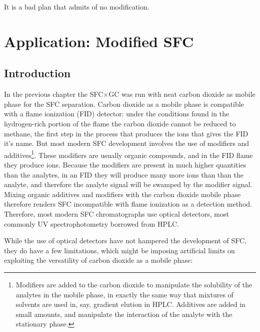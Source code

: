 
\begin{savequote}[\quotewidth]
It is a bad plan that admits of no modification.
\end{savequote}

\chapter{Application: Modified SFC} %

\label{Chapter7} %

\section{Introduction}

In the previous chapter the SFC×GC was run with neat carbon dioxide as mobile
phase for the SFC separation. Carbon dioxide as a mobile phase is compatible with
a flame ionization (FID) detector: under the conditions found in the
hydrogen-rich portion of the flame the carbon dioxide cannot be reduced to
methane, the first step in the process that produces the ions that gives the FID
it's name. But most modern SFC development involves the use of modifiers and
additives\footnote{Modifiers are added to the carbon dioxide to manipulate the
solubility of the analytes in the mobile phase, in exactly the same way that
mixtures of solvents are used in, say, gradient elution in HPLC. Additives are
added in small amounts, and manipulate the interaction of the analyte with the
stationary phase.}. These modifiers are usually organic compounds, and in the FID
flame they produce ions. Because the modifiers are present in much higher
quantities than the analytes, in an FID they will produce many more ions than
than the analyte, and therefore the analyte signal will be swamped by the
modifier signal. Mixing organic additives and modifiers
with the carbon dioxide mobile phase therefore renders SFC incompatible
with flame ionization as a detection method. Therefore, most modern SFC
chromatographs use optical detectors, most commonly UV spectrophotometry
borrowed from HPLC.

While the use of optical detectors have not hampered the development of SFC,
they do have a few limitations, which might be imposing artificial limits on
exploiting the versatility of carbon dioxide as a mobile phase:

